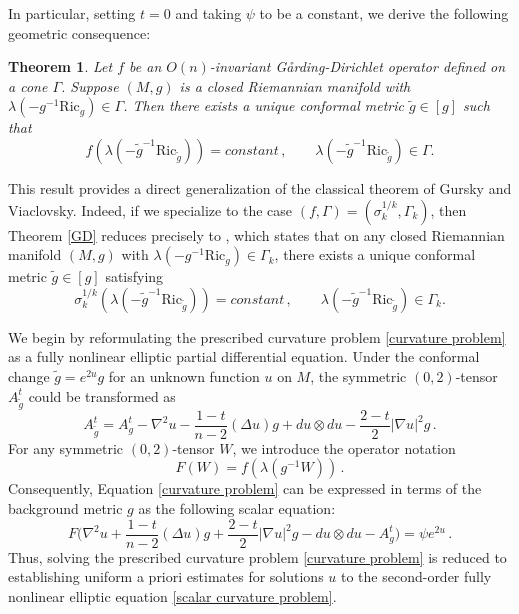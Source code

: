 \documentclass{article}
\theoremstyle{plain}
\newtheorem{theorem}{Theorem}[section]
\theoremstyle{definition}
\theoremstyle{definition}
\numberwithin{equation}{section}
\begin{document}
\begin{sloppypar}
In particular, setting $t = 0$  and taking  $\psi$ to be a constant, we derive the following geometric consequence:
\begin{theorem}\label{Mp Ric}
Let $f$ be an $O(n)$-invariant G\r{a}rding-Dirichlet operator defined on a cone $\Gamma$. Suppose $(M,g)$ is a closed Riemannian manifold with $\lambda(-g^{-1}\mathrm{Ric}_{g})\in \Gamma$. Then there exists a unique conformal metric $\tilde{g}\in [g]$ such that 
\[
f(\lambda(-\tilde{g}^{-1}\mathrm{Ric}_{\tilde{g}})) =constant\,, \qquad \lambda(-\tilde{g}^{-1}\mathrm{Ric}_{\tilde{g}})\in \Gamma. 
\]
\end{theorem}
This result provides a direct generalization of the classical theorem of Gursky and Viaclovsky. Indeed, if we specialize to the case $(f,\Gamma)=(\sigma_{k}^{1/k},\Gamma_{k})$, then Theorem \ref{GD} reduces precisely to \cite[Theorem 1.1]{GV03}, which states that on any closed Riemannian manifold $(M,g)$ with  $\lambda(-g^{-1}\mathrm{Ric}_{g})\in \Gamma_{k}$, there exists a unique conformal metric $\tilde{g}\in [g]$ satisfying
\[
\sigma_{k}^{1/k}(\lambda(-\tilde{g}^{-1}\mathrm{Ric}_{\tilde{g}})) =constant\,, \qquad \lambda(-\tilde{g}^{-1}\mathrm{Ric}_{\tilde{g}})\in \Gamma_{k}. 
\]



We begin by reformulating the prescribed curvature problem \eqref{curvature problem} as a fully nonlinear elliptic partial differential equation. Under the conformal change $\tilde{g} = e^{2u}g$ for an unknown function $u$ on $M$, the symmetric $(0,2)$-tensor $A_{\tilde{g}}^{t}$ could be transformed as
\[
A^{t}_{\tilde{g}}=A^{t}_{g}-\nabla^2u-\frac{1-t}{n-2}(\Delta u)g+du\otimes du-\frac{2-t}{2}|\nabla u|^2g\,.
\]
For any symmetric $(0,2)$-tensor $W$, we introduce the operator notation
\begin{equation*}
F(W)=f(\lambda(g^{-1}W))\,.
\end{equation*}
Consequently,  Equation \eqref{curvature problem} can be expressed in terms of the background metric $g$ as the following scalar equation:
\begin{equation}\label{scalar curvature problem}
F\Big(\nabla^2u+\frac{1-t}{n-2}(\Delta u)g+\frac{2-t}{2}|\nabla u|^2g-du\otimes du-A^{t}_{g}\Big)=\psi e^{2u}\,.
\end{equation}
Thus, solving the prescribed curvature problem \eqref{curvature problem} is reduced to establishing uniform a priori estimates for solutions $u$ to the second-order  fully nonlinear elliptic equation \eqref{scalar curvature problem}.\medskip


\end{sloppypar}
\end{document}
